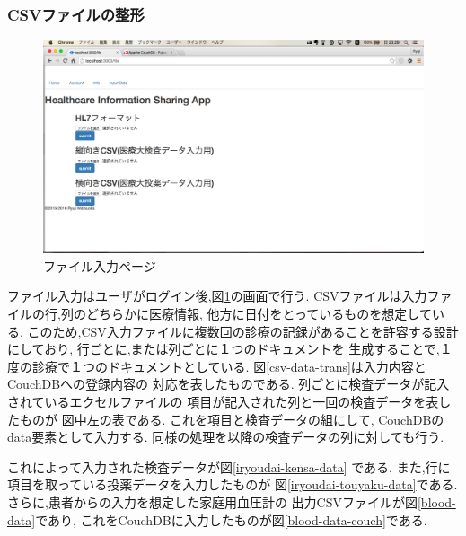 		\subsubsection{CSVファイルの整形}

			\begin{figure}[htbp]
					\includegraphics[width=15cm, bb=0 0 1366 1078, clip]{./gazou/fileiopage.png}
				\caption{ファイル入力ページ}
				\label{fileiopage}
			\end{figure}
			ファイル入力はユーザがログイン後,図\ref{fileiopage}の画面で行う.
			CSVファイルは入力ファイルの行,列のどちらかに医療情報,
			他方に日付をとっているものを想定している.
			このため,CSV入力ファイルに複数回の診療の記録があることを許容する設計にしており,
			行ごとに,または列ごとに１つのドキュメントを
			生成することで,１度の診療で１つのドキュメントとしている.
			図\ref{csv-data-trans}は入力内容とCouchDBへの登録内容の
			対応を表したものである.
			列ごとに検査データが記入されているエクセルファイルの
			項目が記入された列と一回の検査データを表したものが
			図中左の表である.
			これを項目と検査データの組にして,
			CouchDBのdata要素として入力する.
			同様の処理を以降の検査データの列に対しても行う.

			これによって入力された検査データが図\ref{iryoudai-kensa-data}
			である.
			また,行に項目を取っている投薬データを入力したものが
			図\ref{iryoudai-touyaku-data}である.
			さらに,患者からの入力を想定した家庭用血圧計の
			出力CSVファイルが図\ref{blood-data}であり,
			これをCouchDBに入力したものが図\ref{blood-data-couch}である.


